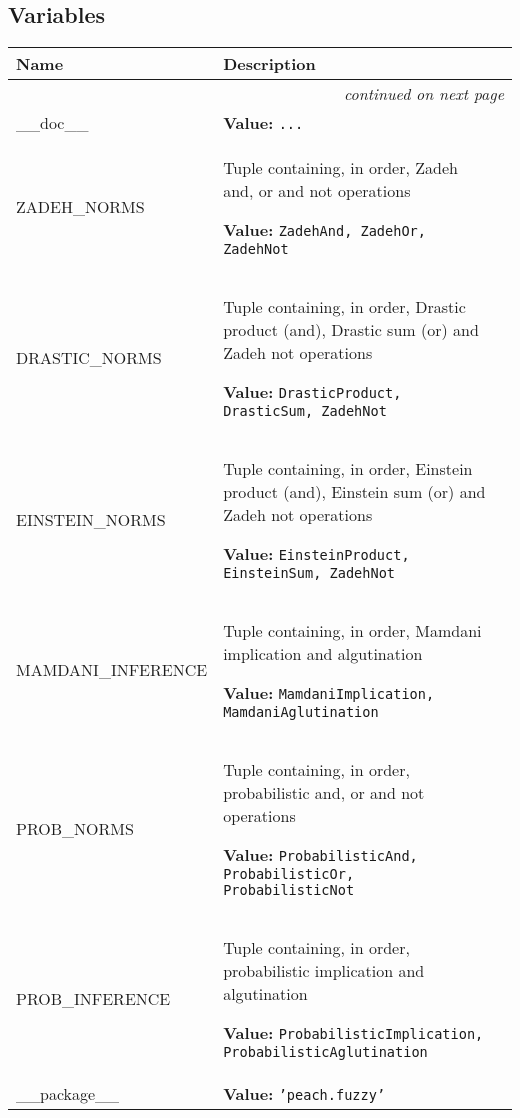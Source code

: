 
  \subsection{Variables}

    \vspace{-1cm}
\hspace{\varindent}\begin{longtable}{|p{\varnamewidth}|p{\vardescrwidth}|l}
\cline{1-2}
\cline{1-2} \centering \textbf{Name} & \centering \textbf{Description}& \\
\cline{1-2}
\endhead\cline{1-2}\multicolumn{3}{r}{\small\textit{continued on next page}}\\\endfoot\cline{1-2}
\endlastfoot\raggedright \_\-\_\-d\-o\-c\-\_\-\_\- & \raggedright \textbf{Value:} 
{\tt \texttt{...}}&\\
\cline{1-2}
\raggedright Z\-A\-D\-E\-H\-\_\-N\-O\-R\-M\-S\- & \raggedright Tuple containing, in order, Zadeh and, or and not operations

\textbf{Value:} 
{\tt ZadehAnd, ZadehOr, ZadehNot}&\\
\cline{1-2}
\raggedright D\-R\-A\-S\-T\-I\-C\-\_\-N\-O\-R\-M\-S\- & \raggedright Tuple containing, in order, Drastic product (and), Drastic sum (or) and Zadeh
not operations

\textbf{Value:} 
{\tt DrasticProduct, DrasticSum, ZadehNot}&\\
\cline{1-2}
\raggedright E\-I\-N\-S\-T\-E\-I\-N\-\_\-N\-O\-R\-M\-S\- & \raggedright Tuple containing, in order, Einstein product (and), Einstein sum (or) and
Zadeh not operations

\textbf{Value:} 
{\tt EinsteinProduct, EinsteinSum, ZadehNot}&\\
\cline{1-2}
\raggedright M\-A\-M\-D\-A\-N\-I\-\_\-I\-N\-F\-E\-R\-E\-N\-C\-E\- & \raggedright Tuple containing, in order, Mamdani implication and algutination

\textbf{Value:} 
{\tt MamdaniImplication, MamdaniAglutination}&\\
\cline{1-2}
\raggedright P\-R\-O\-B\-\_\-N\-O\-R\-M\-S\- & \raggedright Tuple containing, in order, probabilistic and, or and not operations

\textbf{Value:} 
{\tt ProbabilisticAnd, ProbabilisticOr, ProbabilisticNot}&\\
\cline{1-2}
\raggedright P\-R\-O\-B\-\_\-I\-N\-F\-E\-R\-E\-N\-C\-E\- & \raggedright Tuple containing, in order, probabilistic implication and algutination

\textbf{Value:} 
{\tt ProbabilisticImplication, ProbabilisticAglutination}&\\
\cline{1-2}
\raggedright \_\-\_\-p\-a\-c\-k\-a\-g\-e\-\_\-\_\- & \raggedright \textbf{Value:} 
{\tt \texttt{'}\texttt{peach.fuzzy}\texttt{'}}&\\
\cline{1-2}
\end{longtable}

